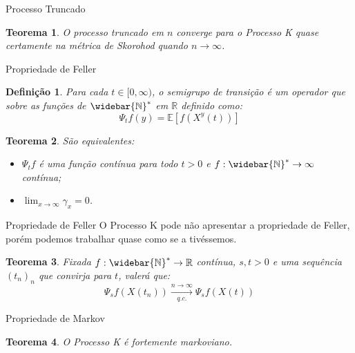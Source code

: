 \documentclass[xcolor=pdftex,dvipsnames]{beamer}
\newcommand{\Nzb}{{\mathbb{\widebar{N}^*}}}
\newcommand{\R}{{\mathbb{R}}}
\newcommand{\E}{{\mathbb{E}}}
\newtheorem{teorema}{Teorema}
\newtheorem{definicao}{Definição}
\begin{document}
\begin{frame}{Processo Truncado}
  \begin{teorema}
    O processo truncado em $n$ converge para o Processo K quase
    certamente na métrica de Skorohod quando $n \to \infty$.
  \end{teorema}
\end{frame}


\begin{frame}{Propriedade de Feller}

  \begin{definicao}
    Para cada $t \in [0, \infty)$, o semigrupo de transição é um
    operador que sobre as funções de $\Nzb$ em $\R$ definido como:
    \begin{displaymath}
      \Psi_t f (y) = \E \left[ f(X^y(t)) \right]
    \end{displaymath}
  \end{definicao} \pause

  \begin{teorema}
    São equivalentes:
    \begin{itemize}
    \item $\Psi_t f$ é uma função contínua para todo $t > 0$ e $f:
      \Nzb \to \infty$ contínua;
    \item $\displaystyle \lim_{x \to \infty} \gamma_x = 0$.
    \end{itemize}
  \end{teorema}
\end{frame}

\begin{frame}{Propriedade de Feller}
  O Processo K pode não apresentar a propriedade de Feller, porém
  podemos trabalhar quase como se a tivéssemos.
  \begin{teorema}
    Fixada $f: \Nzb \to \R$ contínua, $s, t > 0$ e uma sequência
    $(t_n)_n$ que convirja para $t$, valerá que:
    \begin{displaymath}
      \Psi_s f (X(t_n)) \xrightarrow[q.c.]{n \to \infty} \Psi_s f (X(t))
    \end{displaymath}
  \end{teorema}
\end{frame}

\begin{frame}{Propriedade de Markov}
  \begin{teorema}
    O Processo K é fortemente markoviano.
  \end{teorema}
\end{frame}
\end{document}
